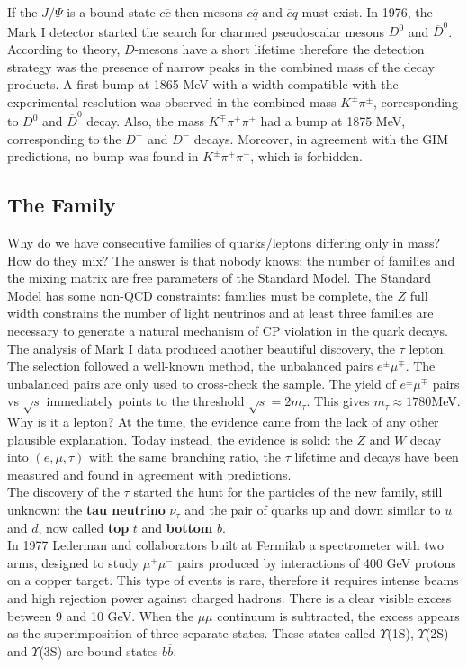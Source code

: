 \documentclass[10.75pt,a4paper,openright,bottom=2cm]{article}
\begin{document}
If the $J/\Psi$ is a bound state $c\overline{c}$ then mesons $c\overline{q}$ and $\overline{c}q$ must exist. In 1976, the Mark I detector started the search for charmed pseudoscalar mesons $D^0$ and $\overline{D}^0$. According to theory, $D$-mesons have a short lifetime therefore the detection strategy was the presence of narrow peaks in the combined mass of the decay products. A first bump at 1865 MeV with a width compatible with the experimental resolution was observed in the combined mass $K^\pm\pi^\pm$, corresponding to $D^0$ and $\overline{D}^0$ decay. Also, the mass $K^\mp\pi^\pm\pi^\pm$ had a bump at 1875 MeV, corresponding to the $D^+$ and $D^-$ decays. Moreover, in agreement with the GIM predictions, no bump was found in $K^\pm\pi^+\pi^-$, which is forbidden.
\subsection{The  Family}
Why do we have consecutive families of quarks/leptons differing only in mass? How do they mix? The answer is that nobody knows: the number of families and the mixing matrix are free parameters of the Standard Model. The Standard Model has some non-QCD constraints: families must be complete, the $Z$ full width constrains the number of light neutrinos and at least three families are necessary to generate a natural mechanism of CP violation in the quark decays.\\
The analysis of Mark I data produced another beautiful discovery, the $\tau$ lepton. The selection followed a well-known method, the unbalanced pairs $e^\pm\mu^\mp$. The unbalanced pairs are only used to cross-check the sample. The yield of $e^\pm\mu^\mp$ pairs vs $\sqrt{s}$ immediately points to the threshold $\sqrt{s}=2m_\tau$. This gives $m_\tau\approx1780$\;MeV. Why is it a lepton? At the time, the evidence came from the lack of any other plausible explanation. Today instead, the evidence is solid: the $Z$ and $W$ decay into $(e,\mu,\tau)$ with the same branching ratio, the $\tau$ lifetime and decays have been measured and found in agreement with predictions.\\
The discovery of the $\tau$ started the hunt for the particles of the new family, still unknown: the \textbf{tau neutrino} $\nu_\tau$ and the pair of quarks up and down similar to $u$ and $d$, now called \textbf{top} $t$ and \textbf{bottom} $b$.\\
In 1977 Lederman and collaborators built at Fermilab a spectrometer with two arms, designed to study $\mu^+\mu^-$ pairs produced by interactions of 400 GeV protons on a copper target. This type of events is rare, therefore it requires intense beams and high rejection power against charged hadrons. There is a clear visible excess between 9 and 10 GeV. When the $\mu\mu$ continuum is subtracted, the excess appears as the superimposition of three separate states. These states called $\Upsilon$(1S), $\Upsilon$(2S) and $\Upsilon$(3S) are bound states $b\overline{b}$.\\
\end{document}
